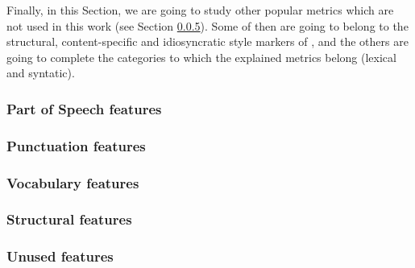 Finally, in this Section, we are going to study other popular metrics which are not used in this work (see Section \ref{sssect:unusedf}). Some of then are going to belong to the structural, content-specific and idiosyncratic style markers of \cite{abbasi2008writeprints}, and the others are going to complete the categories to which the explained metrics belong (lexical and syntatic).

\subsubsection{Part of Speech features}\label{sssect:posf}

\subsubsection{Punctuation features}\label{sssect:punctf}

\subsubsection{Vocabulary features}\label{sssect:vocabf}

\subsubsection{Structural features}\label{sssect:strucf}

\subsubsection{Unused features}\label{sssect:unusedf}